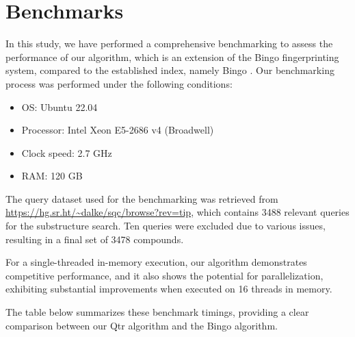 \section{Benchmarks}

In this study, we have performed a comprehensive benchmarking to assess the performance of our algorithm, which is an extension 
of the Bingo fingerprinting system, compared to the established index, namely Bingo \cite{Pavlov2010}.
Our benchmarking process 
was performed under the following conditions:

\begin{itemize}
\item OS: Ubuntu 22.04
\item Processor: Intel Xeon E5-2686 v4 (Broadwell)
\item Clock speed: 2.7 GHz
\item RAM: 120 GB
\end{itemize}

The query dataset used for the benchmarking was retrieved from \url{https://hg.sr.ht/~dalke/sqc/browse?rev=tip}, which contains 3488 
relevant queries for the substructure search. Ten queries were excluded due to various issues, resulting in a final set of 3478 compounds.

For a single-threaded in-memory execution, our algorithm demonstrates competitive performance, and it also shows the potential for 
parallelization, exhibiting substantial improvements when executed on 16 threads in memory.

The table below summarizes these benchmark timings, providing a clear comparison between our Qtr algorithm and the Bingo algorithm.

